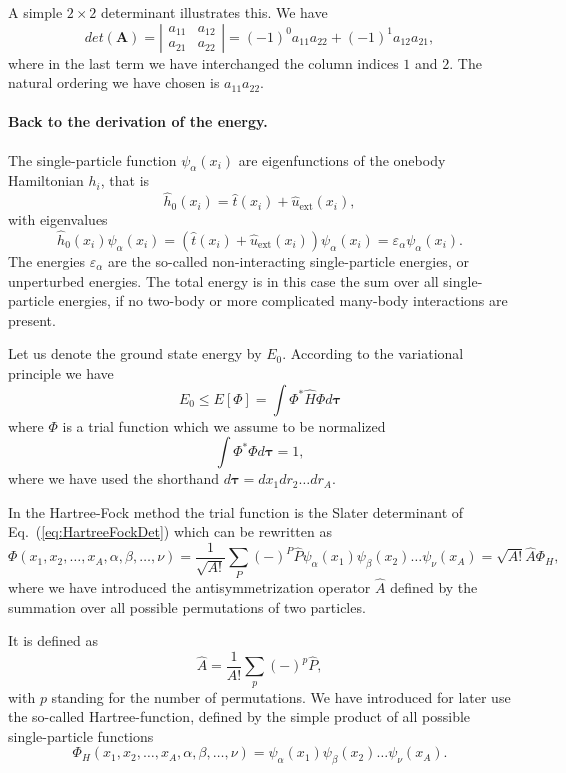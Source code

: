 A simple $2\times 2$ determinant illustrates this. We have
\[
   det(\mathbf{A})=
\left| \begin{array}{cc} a_{11}& a_{12}\\
                            a_{21}&a_{22}\end{array} \right|= (-1)^0a_{11}a_{22}+(-1)^1a_{12}a_{21},
\]
where in the last term we have interchanged the column indices $1$ and $2$. The natural ordering we have chosen is $a_{11}a_{22}$. 

\paragraph{Back to the derivation of the energy.}
The single-particle function $\psi_{\alpha}(x_i)$  are eigenfunctions of the onebody
Hamiltonian $h_i$, that is
\[
\hat{h}_0(x_i)=\hat{t}(x_i) + \hat{u}_{\mathrm{ext}}(x_i),
\]
with eigenvalues 
\[
\hat{h}_0(x_i) \psi_{\alpha}(x_i)=\left(\hat{t}(x_i) + \hat{u}_{\mathrm{ext}}(x_i)\right)\psi_{\alpha}(x_i)=\varepsilon_{\alpha}\psi_{\alpha}(x_i).
\]
The energies $\varepsilon_{\alpha}$ are the so-called non-interacting single-particle energies, or unperturbed energies. 
The total energy is in this case the sum over all  single-particle energies, if no two-body or more complicated
many-body interactions are present.

Let us denote the ground state energy by $E_0$. According to the
variational principle we have
\[
  E_0 \le E[\Phi] = \int \Phi^*\hat{H}\Phi d\mathbf{\tau}
\]
where $\Phi$ is a trial function which we assume to be normalized
\[
  \int \Phi^*\Phi d\mathbf{\tau} = 1,
\]
where we have used the shorthand $d\mathbf{\tau}=dx_1dr_2\dots dr_A$.

In the Hartree-Fock method the trial function is the Slater
determinant of Eq.~(\ref{eq:HartreeFockDet}) which can be rewritten as 
\[
  \Phi(x_1,x_2,\dots,x_A,\alpha,\beta,\dots,\nu) = \frac{1}{\sqrt{A!}}\sum_{P} (-)^P\hat{P}\psi_{\alpha}(x_1)
    \psi_{\beta}(x_2)\dots\psi_{\nu}(x_A)=\sqrt{A!}\hat{A}\Phi_H,
\]
where we have introduced the antisymmetrization operator $\hat{A}$ defined by the 
summation over all possible permutations of two particles.

It is defined as
\begin{equation}
  \hat{A} = \frac{1}{A!}\sum_{p} (-)^p\hat{P},
\label{antiSymmetryOperator}
\end{equation}
with $p$ standing for the number of permutations. We have introduced for later use the so-called
Hartree-function, defined by the simple product of all possible single-particle functions
\[
  \Phi_H(x_1,x_2,\dots,x_A,\alpha,\beta,\dots,\nu) =
  \psi_{\alpha}(x_1)
    \psi_{\beta}(x_2)\dots\psi_{\nu}(x_A).
\]

